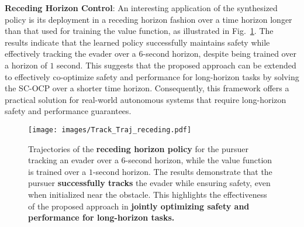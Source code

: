 \textbf{Receding Horizon Control}: An interesting application of the synthesized policy is its deployment in a receding horizon fashion over a time horizon longer than that used for training the value function, as illustrated in Fig.~\ref{fig: receding_Track}. The results indicate that the learned policy successfully maintains safety while effectively tracking the evader over a $6$-second horizon, despite being trained over a horizon of $1$ second. This suggests that the proposed approach can be extended to effectively co-optimize safety and performance for long-horizon tasks by solving the SC-OCP over a shorter time horizon. Consequently, this framework offers a practical solution for real-world autonomous systems that require long-horizon safety and performance guarantees.
\begin{figure}[h]
    \centering
    \texttt{[image: images/Track\_Traj\_receding.pdf]}
    \vspace{-1.3em}
\caption{Trajectories of the \textbf{receding horizon policy} for the pursuer tracking an evader over a $6$-second horizon, while the value function is trained over a $1$-second horizon. The results demonstrate that the pursuer \textbf{successfully tracks} the evader while ensuring safety, even when initialized near the obstacle. This highlights the effectiveness of the proposed approach in \textbf{jointly optimizing safety and performance for long-horizon tasks.}} 
\label{fig: receding_Track}
\vspace{-1.3em}
\end{figure}

\vspace{-0.8em}
